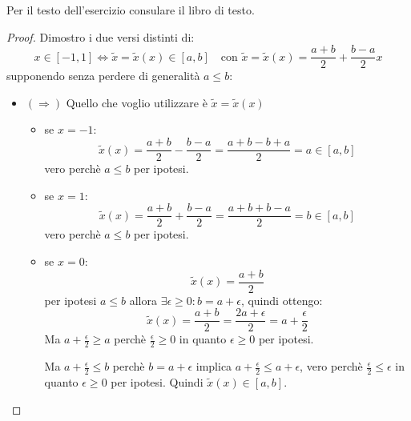 \begin{exercise}[4.12]
\label{exercise:exercise412}
Per il testo dell'esercizio consulare il libro di testo.
\end{exercise}
\begin{proof}
	Dimostro i due versi distinti di:
	\begin{displaymath}
	x \in [-1,1] \Leftrightarrow \tilde{x} = \tilde{x}(x) \in
	[a, b] \quad \text{con } \tilde{x} = \tilde{x}(x) = \frac{a + b}{2} +
	\frac{b-a}{2}x
	\end{displaymath}
	supponendo senza perdere di generalit\`a $a \leq b$:
	\begin{itemize}
	  \item $(\Rightarrow)$ Quello che voglio utilizzare \`e $\tilde{x} =
	  \tilde{x}(x)$
		\begin{itemize}
	  		\item se $x = -1$:
	  		\begin{displaymath}
	  			\tilde{x}(x) = \frac{a + b}{2} - \frac{b-a}{2} = 
	  			\frac{a + b - b +a}{2} = a \in [a,b]
	  		\end{displaymath}
	  		vero perch\`e $a \leq b$ per ipotesi.
	  		\item se $x = 1$:
	  		\begin{displaymath}
	  			\tilde{x}(x) = \frac{a + b}{2} + \frac{b-a}{2} = 
	  			\frac{a + b + b -a}{2} = b \in [a,b]
	  		\end{displaymath}
	  		vero perch\`e $a \leq b$ per ipotesi.
	  		\item se $x = 0$:
	  		\begin{displaymath}
	  			\tilde{x}(x) = \frac{a + b}{2} 
	  		\end{displaymath}
	  		per ipotesi $a \leq b$ allora $\exists \epsilon \geq 0: b = a + \epsilon$,
	  		quindi ottengo:
	  		\begin{displaymath}
	  			\tilde{x}(x) = \frac{a + b}{2} = \frac{2a + \epsilon}{2} =
	  				a + \frac{\epsilon}{2}   
	  		\end{displaymath}
	  		Ma $a + \frac{\epsilon}{2} \geq a$ perch\`e $\frac{\epsilon}{2} \geq 0$ 
	  		in quanto $\epsilon \geq 0$ per ipotesi.
	  		
	  		Ma $a + \frac{\epsilon}{2} \leq b$ perch\`e $b = a + \epsilon$ implica
	  		$a + \frac{\epsilon}{2} \leq a + \epsilon$, vero perch\`e
	  		$\frac{\epsilon}{2} \leq \epsilon$ in quanto $\epsilon \geq 0$ per ipotesi.
	  		Quindi $\tilde{x}(x) \in [a,b]$.
		\end{itemize}  
		

\end{itemize}
\end{proof}
